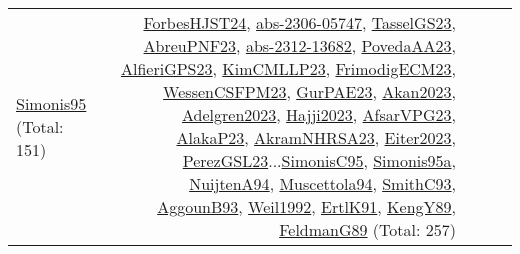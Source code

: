{\begin{longtable}{p{3cm}r>{\raggedright\arraybackslash}p{6cm}>{\raggedright\arraybackslash}p{6cm}>{\raggedright\arraybackslash}p{8cm}}
\hyperref[detail:Simonis95]{Simonis95} (Total: 151) & \hyperref[detail:ForbesHJST24]{ForbesHJST24}, \hyperref[detail:abs-2306-05747]{abs-2306-05747}, \hyperref[detail:TasselGS23]{TasselGS23}, \hyperref[detail:AbreuPNF23]{AbreuPNF23}, \hyperref[detail:abs-2312-13682]{abs-2312-13682}, \hyperref[detail:PovedaAA23]{PovedaAA23}, \hyperref[detail:AlfieriGPS23]{AlfieriGPS23}, \hyperref[detail:KimCMLLP23]{KimCMLLP23}, \hyperref[detail:FrimodigECM23]{FrimodigECM23}, \hyperref[detail:WessenCSFPM23]{WessenCSFPM23}, \hyperref[detail:GurPAE23]{GurPAE23}, \hyperref[detail:Akan2023]{Akan2023}, \hyperref[detail:Adelgren2023]{Adelgren2023}, \hyperref[detail:Hajji2023]{Hajji2023}, \hyperref[detail:AfsarVPG23]{AfsarVPG23}, \hyperref[detail:AlakaP23]{AlakaP23}, \hyperref[detail:AkramNHRSA23]{AkramNHRSA23}, \hyperref[detail:Eiter2023]{Eiter2023}, \hyperref[detail:PerezGSL23]{PerezGSL23}...\hyperref[detail:SimonisC95]{SimonisC95}, \hyperref[detail:Simonis95a]{Simonis95a}, \hyperref[detail:NuijtenA94]{NuijtenA94}, \hyperref[detail:Muscettola94]{Muscettola94}, \hyperref[detail:SmithC93]{SmithC93}, \hyperref[detail:AggounB93]{AggounB93}, \hyperref[detail:Weil1992]{Weil1992}, \hyperref[detail:ErtlK91]{ErtlK91}, \hyperref[detail:KengY89]{KengY89}, \hyperref[detail:FeldmanG89]{FeldmanG89} (Total: 257)\\
\end{longtable}
}

\clearpage
